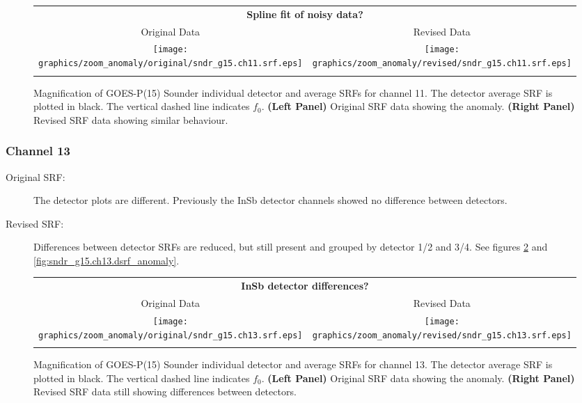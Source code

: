 \begin{figure}[htp]
  \centering
  \begin{tabular}{c c}
    \multicolumn{2}{c}{\textsf{\bfseries Spline fit of noisy data?}} \\
    \hspace{1.5em}\textsf{Original Data} &
    \hspace{1.5em}\textsf{Revised Data} \\
    \texttt{[image: graphics/zoom\_anomaly/original/sndr\_g15.ch11.srf.eps]} &
    \texttt{[image: graphics/zoom\_anomaly/revised/sndr\_g15.ch11.srf.eps]} \\\\
  \end{tabular}
  \caption{Magnification of GOES-P(15) Sounder individual detector and average SRFs for channel 11. The detector average SRF is plotted in black. The vertical dashed line indicates $f_0$. \textbf{(Left Panel)} Original SRF data showing the anomaly. \textbf{(Right Panel)} Revised SRF data showing similar behaviour.}
  \label{fig:sndr_g15.ch11.anomaly}
\end{figure}

\subsubsection{Channel 13}
\begin{description}
  \item[Original SRF:] The detector plots are different. Previously the InSb detector channels showed no difference between detectors.
  \item[Revised SRF:]  Differences between detector SRFs are reduced, but still present and grouped by detector 1/2 and 3/4. See figures \ref{fig:sndr_g15.ch13.anomaly} and \ref{fig:sndr_g15.ch13.dsrf_anomaly}.
\end{description}

\begin{figure}[htp]
  \centering
  \begin{tabular}{c c}
    \multicolumn{2}{c}{\textsf{\bfseries InSb detector differences?}} \\
    \hspace{1.5em}\textsf{Original Data} &
    \hspace{1.5em}\textsf{Revised Data} \\
    \texttt{[image: graphics/zoom\_anomaly/original/sndr\_g15.ch13.srf.eps]} &
    \texttt{[image: graphics/zoom\_anomaly/revised/sndr\_g15.ch13.srf.eps]} \\\\
  \end{tabular}
  \caption{Magnification of GOES-P(15) Sounder individual detector and average SRFs for channel 13. The detector average SRF is plotted in black. The vertical dashed line indicates $f_0$. \textbf{(Left Panel)} Original SRF data showing the anomaly. \textbf{(Right Panel)}  Revised SRF data still showing differences between detectors.}
  \label{fig:sndr_g15.ch13.anomaly}
\end{figure}

